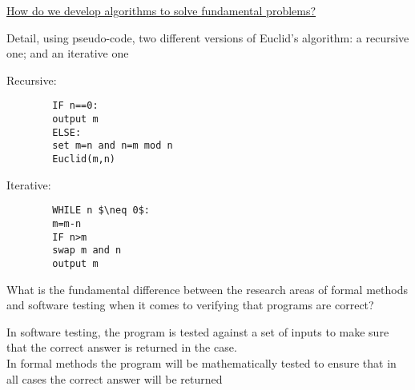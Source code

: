 \documentclass[addpoints]{exam}
\begin{document}
\begin{center}
	\underline{\LARGE How do we develop algorithms to solve fundamental problems?}
\end{center}
\begin{questions}
	\question[6]Detail, using pseudo-code, two different versions of Euclid's algorithm: a recursive one; and an iterative one
	\begin{solution}[2in]
		Recursive:\\
		\begin{lstlisting}
		IF n==0:
		output m
		ELSE:
		set m=n and n=m mod n
		Euclid(m,n)
		\end{lstlisting}
		Iterative:
		\begin{lstlisting}
		WHILE n $\neq 0$:
		m=m-n
		IF n>m
		swap m and n
		output m
		\end{lstlisting}
	\end{solution}


\question[4]What is the fundamental difference between the research areas of formal methods and software testing when it comes to verifying that programs are correct?
\begin{solution}[2in]
	In software testing, the program is tested against a set of inputs to make sure that the correct answer is returned in the case.\\
	In formal methods the program will be mathematically tested to ensure that in all cases the correct answer will be returned\\
\end{solution}


\end{questions}
\end{document}
